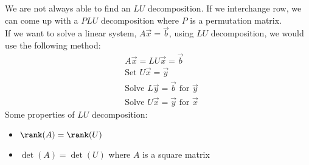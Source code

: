 We are not always able to find an $LU$ decomposition. If we interchange row, we can come up with a $PLU$ decomposition where $P$ is a permutation matrix.\\
If we want to solve a linear system, $A\vec{x}=\vec{b}$, using $LU$ decomposition, we would use the following method:
\begin{align*}
    &A\vec{x}=LU\vec{x}=\vec{b}\\
    &\text{Set }U\vec{x}=\vec{y}\\
    &\text{Solve }L\vec{y}=\vec{b}\text{ for }\vec{y}\\
    &\text{Solve }U\vec{x}=\vec{y}\text{ for }\vec{x}
\end{align*}
Some properties of $LU$ decomposition:
\begin{itemize}
    \item $\rank(A)=\rank(U)$
    \item $\det(A)=\det(U)$ where $A$ is a square matrix
\end{itemize}
